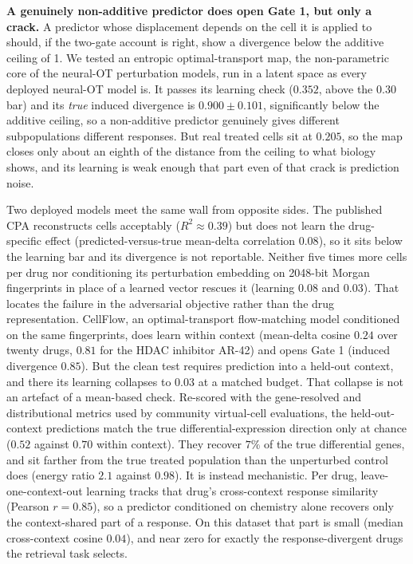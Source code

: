 \documentclass[11pt,letterpaper]{article}
\begin{document}
\textbf{A genuinely non-additive predictor does open Gate 1, but only a crack.} A predictor whose
displacement depends on the cell it is applied to should, if the two-gate account is right, show a
divergence below the additive ceiling of 1. We tested an entropic optimal-transport map, the
non-parametric core of the neural-OT perturbation models\cite{CellOT,Departures}, run in a latent
space as every deployed neural-OT model is. It passes its learning check ($0.352$, above the $0.30$
bar) and its \emph{true} induced divergence is $\mathbf{0.900 \pm 0.101}$, significantly below the
additive ceiling, so a non-additive predictor genuinely gives different subpopulations different
responses. But real treated cells sit at $0.205$, so the map closes only about an eighth of the
distance from the ceiling to what biology shows, and its learning is weak enough that part even of
that crack is prediction noise.

Two deployed models meet the same wall from opposite sides. The published CPA reconstructs cells
acceptably ($R^2 \approx 0.39$) but does not learn the drug-specific effect (predicted-versus-true
mean-delta correlation $0.08$), so it sits below the learning bar and its divergence is not
reportable. Neither five times more cells per drug nor conditioning its perturbation embedding on
2048-bit Morgan fingerprints in place of a learned vector rescues it (learning $0.08$ and $0.03$).
That locates the failure in the adversarial objective rather than the drug representation.
CellFlow\cite{CellFlow}, an optimal-transport flow-matching model conditioned on the same
fingerprints, does learn within context (mean-delta cosine $0.24$ over twenty drugs, $0.81$ for the
HDAC inhibitor AR-42) and opens Gate 1 (induced divergence $0.85$). But the clean test requires
prediction into a held-out context, and there its learning collapses to $0.03$ at a matched budget.
That collapse is not an artefact of a mean-based check. Re-scored with the gene-resolved and
distributional metrics used by community virtual-cell evaluations\cite{VirtualCellChallenge}, the
held-out-context predictions match the true differential-expression direction only at chance
($0.52$ against $0.70$ within context). They recover $7\%$ of the true differential genes, and sit
farther from the true treated population than the unperturbed control does (energy ratio $2.1$
against $0.98$). It is instead mechanistic. Per drug, leave-one-context-out
learning tracks that drug's cross-context response similarity (Pearson $r = 0.85$), so a predictor
conditioned on chemistry alone recovers only the context-shared part of a response. On this
dataset that part is small (median cross-context cosine $0.04$), and near zero for exactly the
response-divergent drugs the retrieval task selects.
\end{document}
